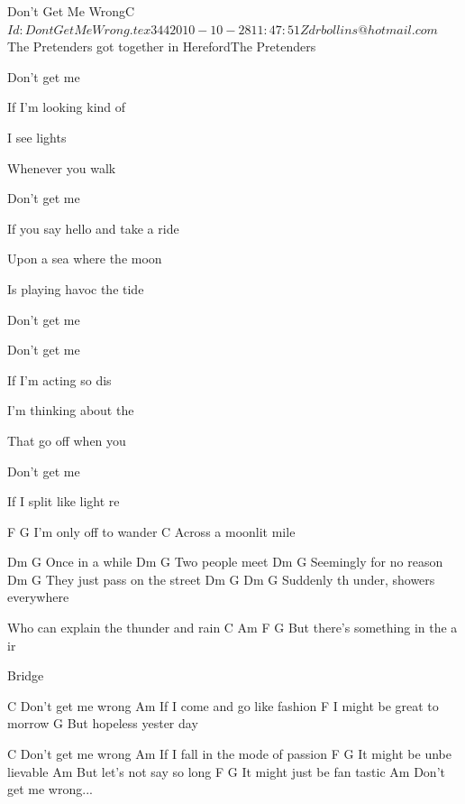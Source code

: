 \begin{SBSong}{Don't Get Me Wrong}{C}
  {$Id: DontGetMeWrong.tex 344 2010-10-28 11:47:51Z drbollins@hotmail.com $}
  {The Pretenders got together in Hereford}{The Pretenders}
  \SBDirection{}
  \begin{SBVerse}
    Don't get me 

    If I'm looking kind of 

    I see  lights

    Whenever you walk 
  \end{SBVerse}
  \begin{SBVerse}
    Don't get me 

    If you say hello and  take a ride

    Upon a sea where the  moon

    Is playing havoc  the tide

    Don't get me    
  \end{SBVerse}
  \begin{SBVerse}
    Don't get me 

    If I'm acting so dis

    I'm thinking about the 

    That go off when you 
  \end{SBVerse}
  \begin{SBVerse}
    Don't get me 

    If I split like light re

    F  G
    I'm only off to   wander
    C
    Across a moonlit   mile
  \end{SBVerse}
  \begin{SBVerse}
    Dm  G
    Once in a while
    Dm  G
    Two people meet
    Dm  G
    Seemingly for no   reason
    Dm  G
    They just   pass on the street
    Dm  G  Dm  G
    Suddenly th  under,   showers everywhere

    Who can explain the thunder and rain
    C  Am  F  G
    But there's something in the a  ir

  \end{SBVerse}
  Bridge
  \begin{SBVerse}
    C
    Don't get me   wrong
    Am
    If I come and go like   fashion
    F
    I might be great to  morrow
    G
    But hopeless yester  day
  \end{SBVerse}
  \begin{SBVerse}
    C
    Don't get me   wrong
    Am
    If I fall in the mode of   passion
    F  G
    It might be unbe  lievable
    Am
    But let's not say so   long
    F  G
    It might just be fan  tastic
    Am
    Don't get me   wrong...
  \end{SBVerse}
\end{SBSong}
